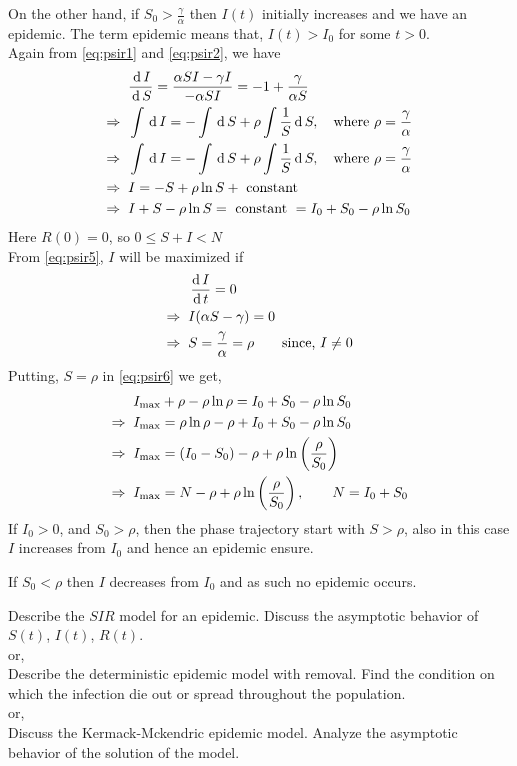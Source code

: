 \documentclass[../main-sheet.tex]{subfiles}
\begin{document}
\begin{soln}
    On the other hand, if \(S_0>\frac{\gamma}{\alpha}\) then \(I(t)\) initially increases and we have an epidemic. The term epidemic means that, \(I(t)>I_0\) for some \(t>0\).\\
    Again from \eqref{eq:psir1} and \eqref{eq:psir2}, we have
    \begin{align}
        &\frac{\,\mathrm{d}\, I}{\,\mathrm{d}\, S}=\frac{\alpha SI-\gamma I}{-\alpha SI}=-1+\frac{\gamma}{\alpha S}\notag\\
        \Rightarrow\;\;&\int \,\mathrm{d}\, I=-\int \,\mathrm{d}\, S+ \rho\int\frac{1}{S}\,\mathrm{d}\, S,\quad\text{where }\rho=\frac{\gamma}{\alpha}\notag\\
        \Rightarrow\;\;&\int \,\mathrm{d}\, I=-\int \,\mathrm{d}\, S+ \rho\int\frac{1}{S}\,\mathrm{d}\, S,\quad\text{where }\rho=\frac{\gamma}{\alpha}\notag\\
        \Rightarrow\;\;&I=-S+ \rho\ln{S}+\text{ constant }\notag\\
        \Rightarrow\;\;&I+S- \rho\ln{S}=\text{ constant }=I_0+S_0- \rho\ln{S_0}\label{eq:psir6}
    \end{align}
    Here \(R(0)=0\), so \(0\leq S+I< N\)\\
    From \eqref{eq:psir5}, \(I\) will be maximized if 
    \begin{align*}
        &\,\frac{\mathrm{d}\,I}{\mathrm{d}\,t}=0\\
        \Rightarrow\;\;&I(\alpha S-\gamma)=0\\
        \Rightarrow\;\;&S=\frac{\gamma}{\alpha}=\rho \qquad \text{since, }I\neq0
    \end{align*}
    Putting, \(S=\rho\) in \eqref{eq:psir6} we get,
    \begin{align}
        &I_{\max} +\rho-\rho \ln \rho=I_0+S_0-\rho \ln S_0\notag\\
        \Rightarrow\;\; &I_{\max} =\rho \ln \rho-\rho+I_0+S_0-\rho \ln S_0\notag\\
        \Rightarrow\;\; &I_{\max} =(I_0-S_0)-\rho +\rho \ln \left( \frac{\rho}{S_0} \right)\label{eq:psir7}\\
        \Rightarrow\;\; &I_{\max} =N-\rho +\rho \ln \left( \frac{\rho}{S_0} \right),\qquad N=I_0+S_0\notag
    \end{align}
    If \(I_0>0\), and \(S_0>\rho\), then the phase trajectory start with \(S>\rho\), also in this case \(I\) increases from \(I_0\) and hence an epidemic ensure.

    If \(S_0<\rho\) then \(I\) decreases from \(I_0\) and as such no epidemic occurs.
\end{soln}
\begin{prob}
    Describe the \(SIR\) model for an epidemic. Discuss the asymptotic behavior of \(S(t)\), \(I(t)\), \(R(t)\).\\
    or,\\
    Describe the deterministic epidemic model with removal. Find the condition on which the infection die out or spread throughout the population.\\
    or,\\
    Discuss the Kermack-Mckendric epidemic model. Analyze the asymptotic behavior of the solution of the model.
\end{prob}
\end{document}
